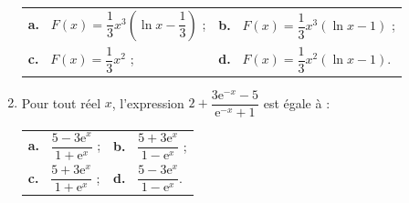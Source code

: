 \begin{enumerate}
\begin{center}
\begin{tabularx}{\linewidth}{*{2}{X}}
\textbf{a.~} $F(x) = \dfrac13 x^3 \left(\ln x - \dfrac13 \right)$ ;&\textbf{b.~} $F(x) = \dfrac13 x^3 (\ln x - 1)$ ;\\[8pt]
\textbf{c.~} $F(x) = \dfrac13 x^2$ ;&\textbf{d.~} $F(x) = \dfrac13 x^2 (\ln x - 1)$.\\
\end{tabularx}
\end{center}

\item Pour tout réel $x$, l'expression $2 + \dfrac{3\text{e}^{-x} - 5}{\text{e}^{-x} + 1}$ est égale à : 

\begin{center}
\begin{tabularx}{\linewidth}{*{2}{X}}
\textbf{a.~} $\dfrac{5 - 3\text{e}^x}{1 + \text{e}^x}$ ;&\textbf{b.~} $\dfrac{5 + 3\text{e}^x}{1 - \text{e}^x}$ ;\\[8pt]
\textbf{c.~} $\dfrac{5 + 3\text{e}^x}{1 + \text{e}^x}$ ;&\textbf{d.~} $\dfrac{5 - 3\text{e}^x}{1 - \text{e}^x}$.
\end{tabularx}
\end{center}
\end{enumerate}

\bigskip
